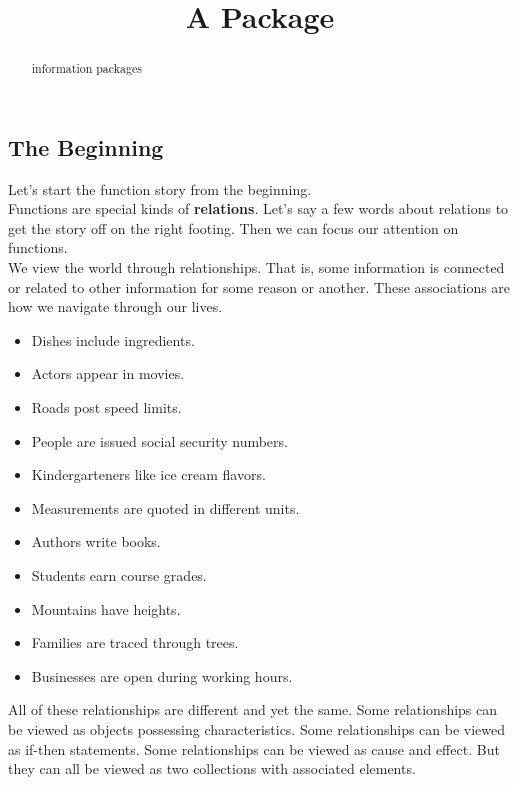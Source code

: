 \documentclass{ximera}
\title{A Package}
\begin{document}
\begin{abstract}
information packages
\end{abstract}
\maketitle





\subsection*{The Beginning}

\hfill\break

Let's start the function story from the beginning. \\


Functions are special kinds of \textbf{\textcolor{blue!55!black}{relations}}.  Let's say a few words about relations to get the story off on the right footing.  Then we can focus our attention on functions. \\



We view the world through relationships. That is, some information is connected or related to other information for some reason or another. These associations are how we navigate through our lives.

\begin{itemize}
\item Dishes include ingredients.
\item Actors appear in movies.
\item Roads post speed limits.
\item People are issued social security numbers.
\item Kindergarteners like ice cream flavors.
\item Measurements are quoted in different units.
\item Authors write books.
\item Students earn course grades.
\item Mountains have heights.
\item Families are traced through trees.
\item Businesses are open during working hours.
\end{itemize}


All of these relationships are different and yet the same.  Some relationships can be viewed as objects possessing characteristics. Some relationships can be viewed as if-then statements.  Some relationships can be viewed as cause and effect. But they can all be viewed as two collections with associated elements.
\end{document}
